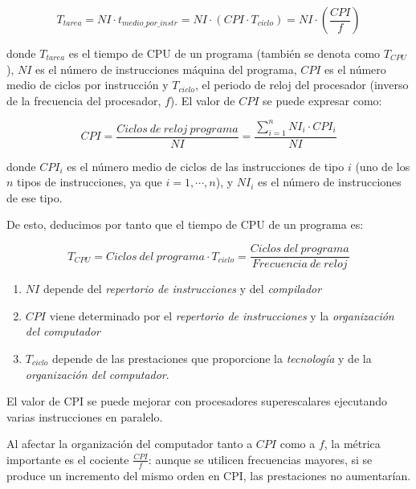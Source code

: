 \documentclass[10pt,a4paper,spanish]{report}
\begin{document}
\begin{equation}
\label{eq:primera}
T_{tarea} = NI \cdot t_{medio\_por\_instr} = NI \cdot (CPI \cdot T_{ciclo}) = NI \cdot (\frac{CPI}{f})
\end{equation}

donde $T_{tarea}$ es el tiempo de CPU de un programa (también se denota como $T_{CPU}$), $NI$ es el número de instrucciones máquina del programa, $CPI$  es el número medio de ciclos por instrucción y $T_{ciclo}$, el periodo de reloj del procesador (inverso de la frecuencia del procesador, $f$). El valor de $CPI$ se puede expresar como:

\begin{equation}
\label{eq:segunda}
CPI = \frac{Ciclos~de~reloj~programa}{NI} = \frac{\sum_{i=1}^n NI_i \cdot CPI_i}{NI}
\end{equation}

donde $CPI_i$ es el número medio de ciclos de las instrucciones de tipo $i$ (uno de los $n$ tipos de instrucciones, ya que $i=1,\cdots,n$), y $NI_i$ es el número de instrucciones de ese tipo.

De esto, deducimos por tanto que el tiempo de CPU de un programa es:

\begin{equation}
\label{eq:tercera}
T_{CPU} = Ciclos~del~programa \cdot T_{ciclo} = \frac{Ciclos~del~programa}{Frecuencia~de~reloj}
\end{equation}

\begin{enumerate}[\color{azul}{\bf $\heartsuit$}]
  \item $NI$ depende del \textit{\textcolor[rgb]{0.2,0.4,0.8}{repertorio de instrucciones}} y del \textit{\textcolor[rgb]{0.2,0.4,0.8}{compilador}}
  \item $CPI$ viene determinado por el \textit{\textcolor[rgb]{0.2,0.4,0.8}{repertorio de instrucciones}} y la \textit{\textcolor[rgb]{0.2,0.4,0.8}{organización del computador}}
  \item $T_{ciclo}$ depende de las prestaciones que proporcione la \textit{\textcolor[rgb]{0.2,0.4,0.8}{tecnología}} y de la \textit{\textcolor[rgb]{0.2,0.4,0.8}{organización del computador}}.
\end{enumerate}

El valor de CPI se puede mejorar con procesadores superescalares ejecutando varias instrucciones en paralelo.

Al afectar la organización del computador tanto a $CPI$ como a $f$, la métrica importante es el cociente $\frac{CPI}{f}$: aunque se utilicen frecuencias mayores, si se produce un incremento del mismo orden en CPI, las prestaciones no aumentarían.
\end{document}
